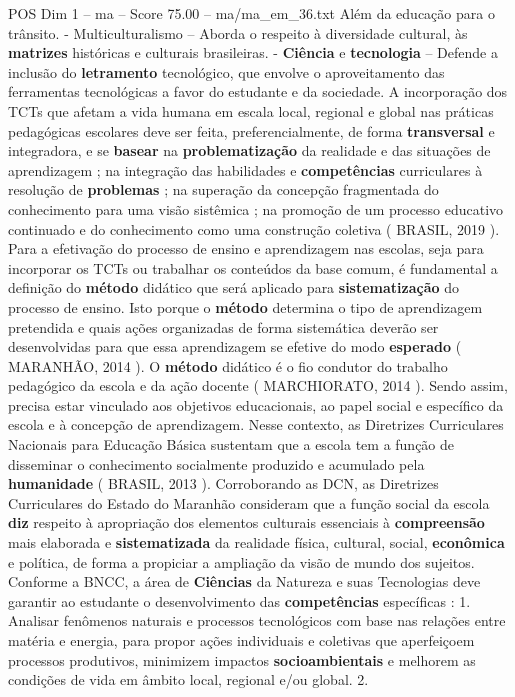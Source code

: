 \begin{textsample}{POS Dim 1 – ma – Score 75.00 – ma/ma\_em\_36.txt}
Além da educação para o trânsito. - Multiculturalismo – Aborda o respeito à diversidade cultural, às \textbf{matrizes} históricas e culturais brasileiras. - \textbf{Ciência} e \textbf{tecnologia} – Defende a inclusão do \textbf{letramento} tecnológico, que envolve o aproveitamento das ferramentas tecnológicas a favor do estudante e da sociedade.
A incorporação dos TCTs que afetam a vida humana em escala local, regional e global nas práticas pedagógicas escolares deve ser feita, preferencialmente, de forma \textbf{transversal} e integradora, e se \textbf{basear} na \textbf{problematização} da realidade e das situações de aprendizagem ; na integração das habilidades e \textbf{competências} curriculares à resolução de \textbf{problemas} ; na superação da concepção fragmentada do conhecimento para uma visão sistêmica ; na promoção de um processo educativo continuado e do conhecimento como uma construção coletiva ( BRASIL, 2019 ).
Para a efetivação do processo de ensino e aprendizagem nas escolas, seja para incorporar os TCTs ou trabalhar os conteúdos da base comum, é fundamental a definição do \textbf{método} didático que será aplicado para \textbf{sistematização} do processo de ensino.
Isto porque o \textbf{método} determina o tipo de aprendizagem pretendida e quais ações organizadas de forma sistemática deverão ser desenvolvidas para que essa aprendizagem se efetive do modo \textbf{esperado} ( MARANHÃO, 2014 ).
O \textbf{método} didático é o fio condutor do trabalho pedagógico da escola e da ação docente ( MARCHIORATO, 2014 ).
Sendo assim, precisa estar vinculado aos objetivos educacionais, ao papel social e específico da escola e à concepção de aprendizagem.
Nesse contexto, as Diretrizes Curriculares Nacionais para Educação Básica sustentam que a escola tem a função de disseminar o conhecimento socialmente produzido e acumulado pela \textbf{humanidade} ( BRASIL, 2013 ).
Corroborando as DCN, as Diretrizes Curriculares do Estado do Maranhão consideram que a função social da escola \textbf{diz} respeito à apropriação dos elementos culturais essenciais à \textbf{compreensão} mais elaborada e \textbf{sistematizada} da realidade física, cultural, social, \textbf{econômica} e política, de forma a propiciar a ampliação da visão de mundo dos sujeitos.
Conforme a BNCC, a área de \textbf{Ciências} da Natureza e suas Tecnologias deve garantir ao estudante o desenvolvimento das \textbf{competências} específicas : 1.
Analisar fenômenos naturais e processos tecnológicos com base nas relações entre matéria e energia, para propor ações individuais e coletivas que aperfeiçoem processos produtivos, minimizem impactos \textbf{socioambientais} e melhorem as condições de vida em âmbito local, regional e/ou global. 2.

\end{textsample}

